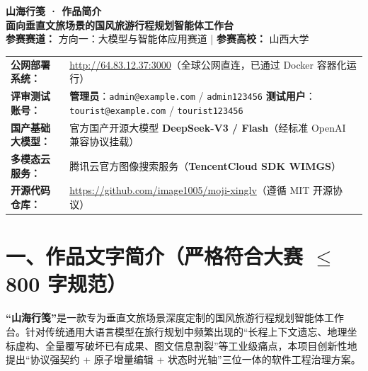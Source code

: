 \documentclass[11pt,a4paper,UTF8]{ctexart}
\begin{document}
\begin{center}
    {\LARGE \bfseries \color{inkred} 山海行笺 · 作品简介}\\[0.4em]
    {\large \textbf{面向垂直文旅场景的国风旅游行程规划智能体工作台}}\\[0.6em]
    \small \textbf{参赛赛道：} 方向一：大模型与智能体应用赛道 \quad | \quad \textbf{参赛高校：} 山西大学
\end{center}

\vspace{0.5em}

\begin{tcolorbox}[colback=paper,colframe=black!25,title=\textbf{【大赛核心速查信息】}]
\small
\begin{tabularx}{\textwidth}{p{3cm}X}
\textbf{公网部署系统：} & \url{http://64.83.12.37:3000}（全球公网直连，已通过 Docker 容器化运行） \\
\textbf{评审测试账号：} & \textbf{管理员}：\texttt{admin@example.com} / \texttt{admin123456} \quad
\textbf{测试用户}：\texttt{tourist@example.com} / \texttt{tourist123456} \\
\textbf{国产基础大模型：} & 官方国产开源大模型 \textbf{DeepSeek-V3 / Flash}（经标准 OpenAI 兼容协议挂载） \\
\textbf{多模态云服务：} & 腾讯云官方图像搜索服务（\textbf{TencentCloud SDK WIMGS}） \\
\textbf{开源代码仓库：} & \url{https://github.com/image1005/moji-xinglv}（遵循 MIT 开源协议） \\
\end{tabularx}
\end{tcolorbox}

\vspace{0.8em}
\section*{一、作品文字简介（严格符合大赛 $\le$ 800 字规范）}

\textbf{“山海行笺”}是一款专为垂直文旅场景深度定制的国风旅游行程规划智能体工作台。针对传统通用大语言模型在旅行规划中频繁出现的“长程上下文遗忘、地理坐标虚构、全量覆写破坏已有成果、图文信息割裂”等工业级痛点，本项目创新性地提出“协议强契约 + 原子增量编辑 + 状态时光轴”三位一体的软件工程治理方案。
\end{document}
